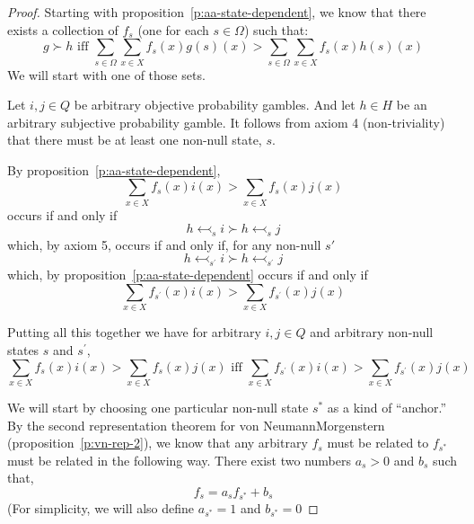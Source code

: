 \begin{proof}
Starting with proposition~\ref{p:aa-state-dependent}, we know that there exists a collection of $f_s$ (one for each $s \in \Omega$) such that:
\begin{equation*}
    g \succ h \text{ iff } \sum_{s \in \Omega} \sum_{x \in X} f_s(x) g(s)(x) > \sum_{s \in \Omega} \sum_{x \in X} f_s(x) h(s)(x)
\end{equation*}
We will start with one of those sets. 

Let $i, j \in Q$ be arbitrary objective probability gambles. And let $h \in H$ be an arbitrary subjective probability gamble. It follows from axiom 4 (non-triviality) that there must be at least one non-null state, $s$. 

By proposition~\ref{p:aa-state-dependent},
\begin{equation*}
\sum_{x \in X} f_s(x)i(x) > \sum_{x \in X} f_s(x)j(x) 
\end{equation*}
occurs if and only if
\begin{equation*}
h \leftarrowtail_s i \succ h \leftarrowtail_s j
\end{equation*}
which, by axiom 5, occurs if and only if, for any non-null $s'$
\begin{equation*}
h \leftarrowtail_{s^\prime} i \succ h \leftarrowtail_{s^\prime} j
\end{equation*}
which, by proposition~\ref{p:aa-state-dependent} occurs if and only if
\begin{equation*}
\sum_{x \in X} f_{s^\prime}(x)i(x) > \sum_{x \in X} f_{s^\prime}(x)j(x) 
\end{equation*}

Putting all this together we have for arbitrary $i, j \in Q$ and arbitrary non-null states $s$ and $s^\prime$,
\begin{equation*}
\sum_{x \in X} f_s(x)i(x) > \sum_{x \in X} f_s(x)j(x) \text{ iff }\sum_{x \in X} f_{s^\prime}(x)i(x) > \sum_{x \in X} f_{s^\prime}(x)j(x) 
\end{equation*}

We will start by choosing one particular non-null state $s^*$ as a kind of ``anchor.'' By the second representation theorem for von Neumann\breakslash Morgenstern (proposition~\ref{p:vn-rep-2}), we know that any arbitrary $f_s$ must be related to $f_{s^*}$ must be related in the following way.  There exist two numbers $a_{s} > 0$ and $b_{s}$ such that, 
\begin{equation*}
f_{s} = a_s f_{s^*} + b_s
\end{equation*}
(For simplicity, we will also define $a_{s^*} = 1$ and $b_{s^*} = 0$


\end{proof}
